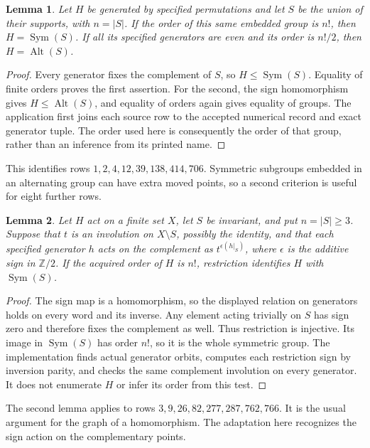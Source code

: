 \documentclass[11pt]{article}
\newtheorem{lemma}{Lemma}
\begin{document}
\begin{lemma}
Let $H$ be generated by specified permutations and let $S$ be the union of
their supports, with $n=|S|$. If the order of this same embedded group is
$n!$, then $H=\operatorname{Sym}(S)$. If all its specified generators are
even and its order is $n!/2$, then $H=\operatorname{Alt}(S)$.
\end{lemma}
\begin{proof}
Every generator fixes the complement of $S$, so $H\leq\operatorname{Sym}(S)$.
Equality of finite orders proves the first assertion. For the second,
the sign homomorphism gives $H\leq\operatorname{Alt}(S)$, and equality of
orders again gives equality of groups. The application first joins each
source row to the accepted numerical record and exact generator tuple.
The order used here is consequently the order of that group, rather than
an inference from its printed name.
\end{proof}

This identifies rows $1,2,4,12,39,138,414,706$. Symmetric subgroups embedded
in an alternating group can have extra moved points, so a second criterion
is useful for eight further rows.

\begin{lemma}
Let $H$ act on a finite set $X$, let $S$ be invariant, and put $n=|S|\geq3$.
Suppose that $t$ is an involution on $X\setminus S$, possibly the identity,
and that each specified generator $h$ acts on the complement as
$t^{\epsilon(h|_S)}$, where $\epsilon$ is the additive sign in $\mathbb Z/2$.
If the acquired order of $H$ is $n!$, restriction identifies $H$ with
$\operatorname{Sym}(S)$.
\end{lemma}
\begin{proof}
The sign map is a homomorphism, so the displayed relation on generators
holds on every word and its inverse. Any element acting trivially on $S$
has sign zero and therefore fixes the complement as well. Thus restriction
is injective. Its image in $\operatorname{Sym}(S)$ has order $n!$, so it
is the whole symmetric group. The implementation finds actual generator
orbits, computes each restriction sign by inversion parity, and checks
the same complement involution on every generator. It does not enumerate
$H$ or infer its order from this test.
\end{proof}

The second lemma applies to rows $3,9,26,82,277,287,762,766$. It is the
usual argument for the graph of a homomorphism. The adaptation here
recognizes the sign action on the complementary points.
\end{document}
